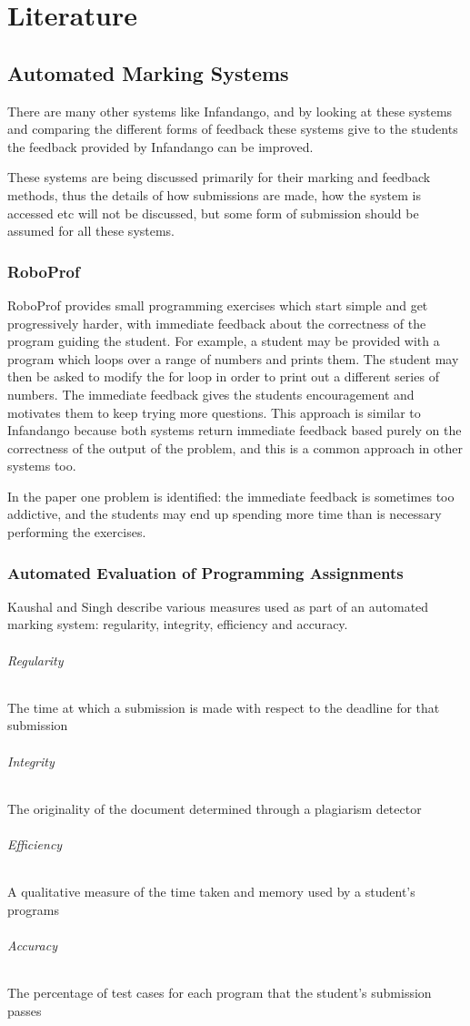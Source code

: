 \chapter{Literature}
\label{background}

\section{Automated Marking Systems}
There are many other systems like Infandango, and by looking at these systems and comparing the different forms of feedback these systems give to the students the feedback provided by Infandango can be improved.

These systems are being discussed primarily for their marking and feedback methods, thus the details of how submissions are made, how the system is accessed etc will not be discussed, but some form of submission should be assumed for all these systems.

\subsection{RoboProf\cite{roboprof}}
RoboProf provides small programming exercises which start simple and get progressively harder, with immediate feedback about the correctness of the program guiding the student. For example, a student may be provided with a program which loops over a range of numbers and prints them. The student may then be asked to modify the for loop in order to print out a different series of numbers. The immediate feedback gives the students encouragement and motivates them to keep trying more questions. This approach is similar to Infandango because both systems return immediate feedback based purely on the correctness of the output of the problem, and this is a common approach in other systems too\cite{webtoteach}.

In the paper one problem is identified: the immediate feedback is sometimes too addictive, and the students may end up spending more time than is necessary performing the exercises.

\subsection{Automated Evaluation of Programming Assignments\cite{automate_evaluation}}
Kaushal and Singh describe various measures used as part of an automated marking system: regularity, integrity, efficiency and accuracy. 
\subparagraph*{Regularity} The time at which a submission is made with respect to the deadline for that submission
\subparagraph*{Integrity} The originality of the document determined through a plagiarism detector
\subparagraph*{Efficiency} A qualitative measure of the time taken and memory used by a student's programs
\subparagraph*{Accuracy} The percentage of test cases for each program that the student's submission passes

